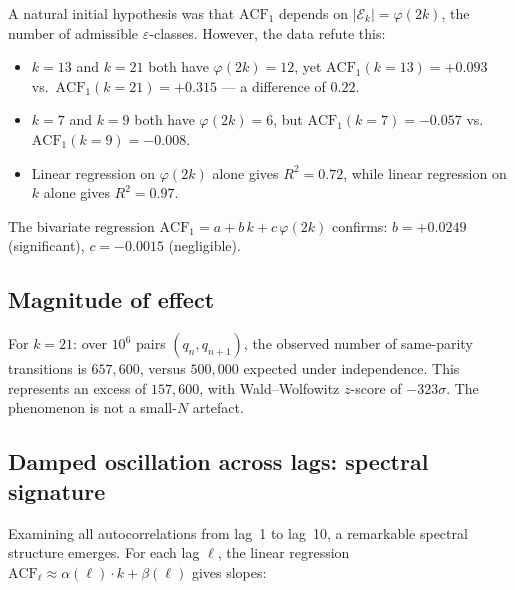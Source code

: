 \documentclass[11pt,a4paper]{article}
\theoremstyle{plain}
\theoremstyle{definition}
\newcommand{\eps}{\varepsilon}
\newcommand{\Eclass}{\mathcal{E}}
\begin{document}
A natural initial hypothesis was that $\mathrm{ACF}_1$ depends on
$|\Eclass_k| = \varphi(2k)$, the number of admissible $\eps$-classes. However,
the data refute this:
\begin{itemize}[leftmargin=*]
\item $k = 13$ and $k = 21$ both have $\varphi(2k) = 12$, yet
$\mathrm{ACF}_1(k=13) = +0.093$ vs.\ $\mathrm{ACF}_1(k=21) = +0.315$ --- a
difference of $0.22$.
\item $k = 7$ and $k = 9$ both have $\varphi(2k) = 6$, but
$\mathrm{ACF}_1(k=7) = -0.057$ vs.\ $\mathrm{ACF}_1(k=9) = -0.008$.
\item Linear regression on $\varphi(2k)$ alone gives $R^2 = 0.72$, while
linear regression on $k$ alone gives $R^2 = 0.97$.
\end{itemize}

The bivariate regression $\mathrm{ACF}_1 = a + b\,k + c\,\varphi(2k)$ confirms:
$b = +0.0249$ (significant), $c = -0.0015$ (negligible).

\subsection{Magnitude of effect}

For $k = 21$: over $10^6$ pairs $(q_n, q_{n+1})$, the observed number of
same-parity transitions is $657{,}600$, versus $500{,}000$ expected under
independence. This represents an excess of $157{,}600$, with Wald--Wolfowitz
$z$-score of $-323\sigma$. The phenomenon is not a small-$N$ artefact.

\subsection{Damped oscillation across lags: spectral signature}

Examining all autocorrelations from lag~1 to lag~10, a remarkable spectral
structure emerges. For each lag $\ell$, the linear regression $\mathrm{ACF}_\ell
\approx \alpha(\ell) \cdot k + \beta(\ell)$ gives slopes:
\end{document}
